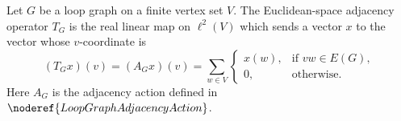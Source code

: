 \begin{definition}
Let \(G\) be a loop graph on a finite vertex set \(V\).  The Euclidean-space
adjacency operator \(T_G\) is the real linear map on \(\ell^2(V)\) which sends a
vector \(x\) to the vector whose \(v\)-coordinate is
\[
  (T_Gx)(v)=(A_Gx)(v)
  =\sum_{w\in V}
    \begin{cases}
      x(w), & \text{if } vw\in E(G),\\
      0, & \text{otherwise}.
    \end{cases}
\]
Here \(A_G\) is the adjacency action defined in \(\noderef{LoopGraphAdjacencyAction}\).
\end{definition}
